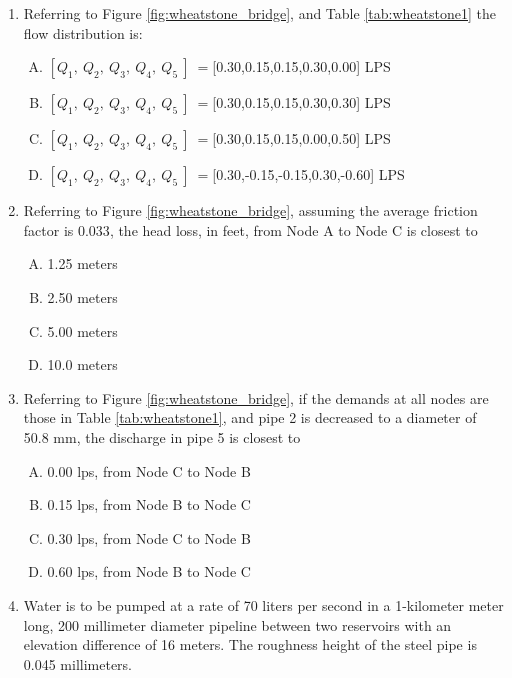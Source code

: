 \documentclass[11pt]{article}
\begin{document}
\begin{enumerate}



\item Referring to Figure \ref{fig:wheatstone_bridge}, and Table \ref{tab:wheatstone1} the flow distribution is:
\begin{enumerate}[(A)]
\item $[Q_1,~Q_2,~Q_3,~Q_4,~Q_5~]~=$[0.30,0.15,0.15,0.30,0.00] LPS
\item $[Q_1,~Q_2,~Q_3,~Q_4,~Q_5~]~=$[0.30,0.15,0.15,0.30,0.30] LPS
\item $[Q_1,~Q_2,~Q_3,~Q_4,~Q_5~]~=$[0.30,0.15,0.15,0.00,0.50] LPS
\item $[Q_1,~Q_2,~Q_3,~Q_4,~Q_5~]~=$[0.30,-0.15,-0.15,0.30,-0.60] LPS
\end{enumerate}
\item Referring to Figure \ref{fig:wheatstone_bridge}, assuming the average friction factor is $0.033$, the head loss, in feet, from Node A to Node C is closest to
\begin{enumerate}[(A)]
\item 1.25 meters 
\item 2.50 meters
\item 5.00 meters
\item 10.0 meters
\end{enumerate}
\item Referring to Figure \ref{fig:wheatstone_bridge}, if the demands at all nodes are those in Table \ref{tab:wheatstone1}, and pipe 2 is decreased to a diameter of 50.8 mm, the discharge in pipe 5 is closest to
\begin{enumerate}[(A)]
\item 0.00 lps, from Node C to Node B  %
\item 0.15 lps, from Node B to Node C
\item 0.30 lps, from Node C to Node B
\item 0.60 lps, from Node B to Node C
\end{enumerate}
\clearpage
\item Water is to be pumped at a rate of 70 liters per second in a 1-kilometer meter long, 200 millimeter diameter pipeline between two reservoirs with an elevation difference of 16 meters.  The roughness height of the steel pipe is 0.045 millimeters.   


\end{enumerate}
\end{document}
